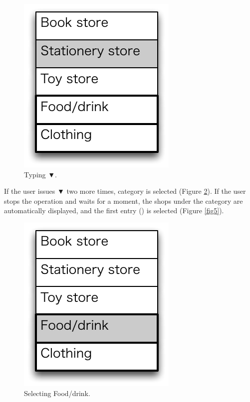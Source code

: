 \documentclass{article}
\def\down{▼}
\begin{document}
\begin{figure}[H]
\centerline{\includegraphics[width=\menuwidth,bb=0 0 139 157]{figures/fig3.pdf}}
\caption{Typing {\down}.}
\label{fig3}
\end{figure}

If the user issues {\down} two more times, 
 category is selected (Figure \ref{fig4}).
If the user stops the operation and waits for a moment, the shops under the 
category are automatically displayed,
and the first entry () is selected (Figure \ref{fig5}).

\begin{figure}[H]
\centerline{\includegraphics[width=\menuwidth,bb=0 0 139 157]{figures/fig4.pdf}}
\caption{Selecting Food/drink.}
\label{fig4}
\end{figure}
\end{document}
